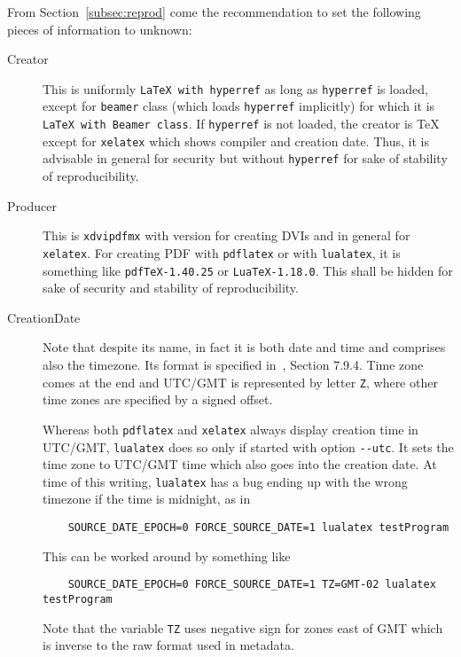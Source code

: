 \documentclass[a4paper, english]{article}%
\newcommand{\pdflatex}{\texttt{pdflatex}}
\newcommand{\lualatex}{\texttt{lualatex}}
\newcommand{\xelatex}{\texttt{xelatex}}
\begin{document}
From Section~\ref{subsec:reprod} come the recommendation 
to set the following pieces of information to unknown: 
%
\begin{description}
  \item[Creator] This is uniformly \texttt{LaTeX with hyperref} 
  as long as \texttt{hyperref} is loaded, except for \texttt{beamer} class 
  (which loads \texttt{hyperref} implicitly)
  for which it is \texttt{LaTeX with Beamer class}. 
  If \texttt{hyperref} is not loaded, 
  the creator is \TeX{} except for \xelatex{} which shows compiler and creation date. 
  Thus, it is advisable in general for security but without \texttt{hyperref} 
  for sake of stability of reproducibility. 
  \item[Producer] This is \texttt{xdvipdfmx} with version for creating DVIs 
  and in general for \xelatex. 
  For creating PDF with \pdflatex{} or with \lualatex, 
  it is something like \texttt{pdfTeX-1.40.25} or \texttt{LuaTeX-1.18.0}. 
  This shall be hidden for sake of security and stability of reproducibility. 
  \item[CreationDate] Note that despite its name, 
  in fact it is both date and time and comprises also the timezone. 
  Its format is specified in~\cite{Pdf20}, Section 7.9.4. 
  Time zone comes at the end and UTC/GMT is represented by letter \texttt{Z}, 
  where other time zones are specified by a signed offset. 

  Whereas both \pdflatex{} and \xelatex{} always display creation time in UTC/GMT, 
  \lualatex{} does so only if started with option \texttt{-{}-utc}. 
  It sets the time zone to UTC/GMT time which also goes into the creation date. 
  At time of this writing, \lualatex{} has a bug ending up with the wrong timezone 
  if the time is midnight, 
  as in 
  \begin{verbatim}
    SOURCE_DATE_EPOCH=0 FORCE_SOURCE_DATE=1 lualatex testProgram
  \end{verbatim}

  This can be worked around by something like 
  \begin{verbatim}
    SOURCE_DATE_EPOCH=0 FORCE_SOURCE_DATE=1 TZ=GMT-02 lualatex testProgram
  \end{verbatim}

  Note that the variable \texttt{TZ} uses negative sign for zones east of GMT 
  which is inverse to the raw format used in metadata. 
  

\end{description}
\end{document}
